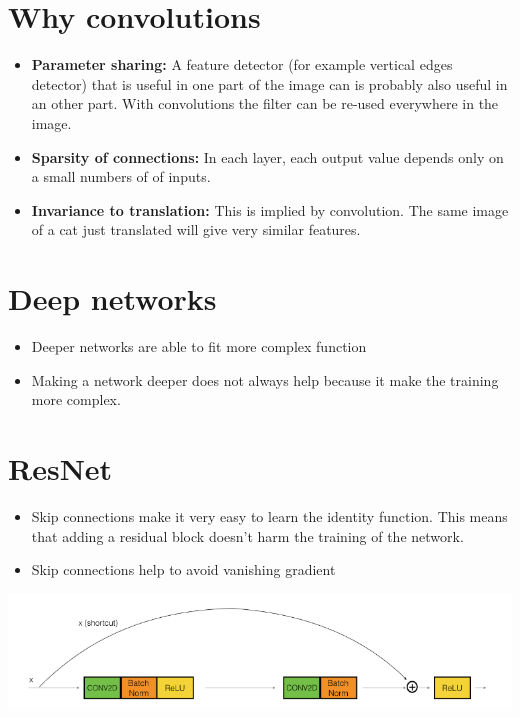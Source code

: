 \section{Why convolutions}
\begin{itemize}
    \item \textbf{Parameter sharing:} A feature detector (for example vertical edges detector) that is useful in one part of the image can is probably also useful in an other part. With convolutions the filter can be re-used everywhere in the image.
    \item \textbf{Sparsity of connections:} In each layer, each output value depends only on a small numbers of of inputs.
    \item \textbf{Invariance to translation:} This is implied by convolution. The same image of a cat just translated will give very similar features.
\end{itemize}


\section{Deep networks}
\begin{itemize}
    \item Deeper networks are able to fit more complex function
    \item Making a network deeper does not always help because it make the training more complex.
\end{itemize}

\section{ResNet}
\begin{itemize}
    \item Skip connections make it very easy to learn the identity function. This means that adding a residual block doesn't harm the training of the network.
    \item Skip connections help to avoid vanishing gradient
\end{itemize}

\includegraphics[scale=0.25]{content/resnet_block.png}



